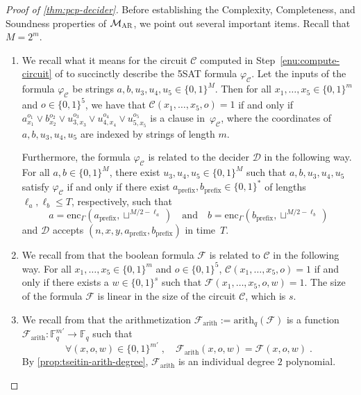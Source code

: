 \documentclass[11pt]{article}
\theoremstyle{definition}
\newcommand{\F}{\ensuremath{\mathbb{F}}}
\newcommand{\decider}{\mathcal{D}}
\newcommand{\gamestyle}[1]{\ensuremath{\textsc{#1}}\xspace}
\newcommand{\ar}{\gamestyle{AR}}
\newcommand{\circuit}{\mathcal{C}}
\newcommand{\formula}{\mathcal{F}}
\newcommand{\pcpverifier}{\mathcal{M}_\ar}
\begin{document}
\begin{proof}[Proof of \cref{thm:pcp-decider}]
Before establishing the Complexity, Completeness, and Soundness properties of
$\pcpverifier$, we point out several important items.
Recall that $M = 2^m$.
\begin{enumerate}
\item We recall what it means for the circuit $\circuit$ computed in
  Step~\ref{enu:compute-circuit} of  to succinctly
  describe the 5SAT formula $\varphi_\circuit$.
  Let the inputs of the formula $\varphi_\circuit$ be strings $a,b,u_3,u_4,u_5
  \in \{0,1\}^M$.
  Then for all $x_1,\ldots,x_5 \in \{0,1\}^m$ and $o \in \{0,1\}^5$, we have
  that $\circuit(x_1,\ldots,x_5,o) = 1$ if and only if $a_{x_1}^{o_1} \lor
  b_{x_2}^{o_2} \lor u_{3, x_3}^{o_3} \lor u_{4, x_4}^{o_4} \lor u_{5,
    x_5}^{o_5}$ is a clause in~$\varphi_\circuit$, where the coordinates of
  $a,b,u_3,u_4,u_5$ are indexed by strings of length $m$.

  Furthermore, the formula $\varphi_\circuit$ is related to the decider
  $\decider$ in the following way.
  For all $a, b\in \{0, 1\}^M$, there exist $u_3, u_4, u_5 \in \{0, 1\}^M$ such
  that $a, b, u_3, u_4, u_5$ satisfy $\varphi_{\circuit}$ if and only if there
  exist $a_{\mathrm{prefix}}, b_{\mathrm{prefix}} \in \{0, 1\}^*$ of
  lengths~$\ell_a, \ell_b \leq T$, respectively, such that
  \begin{equation*}
    a = \mathrm{enc}_\Gamma(a_{\mathrm{prefix}}, \sqcup^{M/2 - \ell_a})
    \quad \text{and} \quad
    b = \mathrm{enc}_\Gamma(b_{\mathrm{prefix}}, \sqcup^{M/2 - \ell_b})
  \end{equation*}
  and $\decider$ accepts $(n, x, y, a_{\mathrm{prefix}}, b_{\mathrm{prefix}})$
  in time~$T$.
  
\item We recall from  that the boolean formula $\formula$ is related to $\circuit$ in the following
  way.
  For all $x_1, \ldots,x_5 \in \{0, 1\}^m$ and $o \in \{0, 1\}^5$,
  $\circuit(x_1,\ldots,x_5, o) = 1$ if and only if there exists a $w \in \{0,
  1\}^s$ such that $\formula(x_1,\ldots,x_5, o, w) = 1$.
  The size of the formula $\formula$ is linear in the size of the circuit
  $\circuit$, which is $s$.
  
\item We recall from  that the arithmetization $\formula_{\mathrm{arith}}:=
  \mathrm{arith}_q(\formula)$ is a function
  $\formula_{\mathrm{arith}}:\F_q^{m'}\rightarrow \F_q$ such that
  \begin{equation}
    \label{eq:farith}
    \forall (x,o,w) \in \{0, 1\}^{m'}\;,
    \quad \formula_{\mathrm{arith}}(x,o,w) = \formula(x,o,w)\;.
  \end{equation}
  By \cref{prop:tseitin-arith-degree}, $\formula_{\mathrm{arith}}$ is an
  individual degree $2$ polynomial.
\end{enumerate}


\end{proof}
\end{document}
